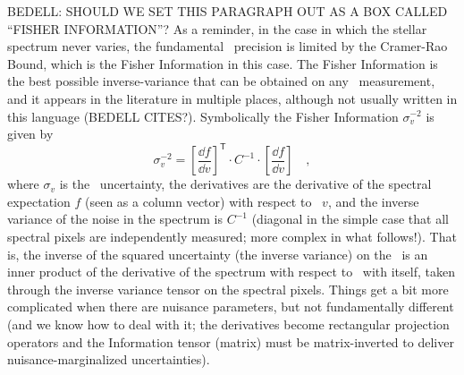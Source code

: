 \documentclass[12pt, letterpaper]{article}
\begin{document}
BEDELL: SHOULD WE SET THIS PARAGRAPH OUT AS A BOX CALLED ``FISHER INFORMATION''?
As a reminder, in the case in which the stellar spectrum never varies,
the fundamental \EPRV\ precision is limited by the Cramer-Rao Bound, which is
the Fisher Information in this case.
The Fisher Information is the best possible inverse-variance that can be obtained
on any \RV\ measurement, and it appears in the literature in multiple places,
although not usually written in this language (BEDELL CITES?).
Symbolically the Fisher Information $\sigma_v^{-2}$ is given by
\begin{equation}\label{eq:fisher}
\sigma_v^{-2} =
\left[\frac{\dd f}{\dd v}\right]^{\mathsf T}\cdot C^{-1}\cdot
\left[\frac{\dd f}{\dd v}\right] \quad ,
\end{equation}
where $\sigma_v$ is the \RV\ uncertainty, the derivatives are the derivative
of the spectral expectation $f$ (seen as a column vector) with respect to \RV\ $v$,
and the inverse variance of the noise in the spectrum is $C^{-1}$ (diagonal in the
simple case that all spectral pixels are independently measured; more complex in
what follows!).
That is, the inverse of the squared uncertainty (the inverse variance) on the
\RV\ is an inner product of the derivative of the spectrum with
respect to \RV\ with itself, taken through the inverse variance tensor on the
spectral pixels.
Things get a bit more complicated when there are nuisance parameters, but
not fundamentally different (and we know how to deal with it; the derivatives
become rectangular projection operators and the Information tensor (matrix)
must be matrix-inverted to deliver nuisance-marginalized uncertainties).
\end{document}
